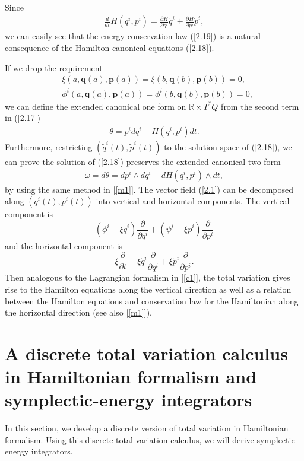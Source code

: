 \documentclass[a4paper,a4paper]{article}
\def\sect#1{\section{#1}\setcounter{equation}{0}}
\def\q{\boldsymbol{q}}
\def\p{\boldsymbol{p}}
\begin{document}
 Since
\begin{align*}
  \frac{d}{dt}H(q^{i}, p^{i})=\frac{\partial H}{\partial q^{i}}\dot{q}^{i}+
                      \frac{\partial H}{\partial p^{i}}\dot{p}^{i},
\end{align*}
 we can easily see that the energy conservation law (\ref{2.19}) is a natural
consequence of the Hamilton canonical equations (\ref{2.18}).

If we drop the requirement
\begin{align*}
 &\xi(a, \q(a), \p(a))=\xi(b, \q(b), \p(b))=0,\\
 &\phi^{i}(a, \q(a), \p(a))=\phi^{i}(b, \q(b), \p(b))=0,
\end{align*}
we can define the extended canonical one form on $\mathbb{R}\times T^{*}Q$ from
the second term in (\ref{2.17})
\begin{align}
\theta=p^{i}dq^{i}-H(q^{i}, p^{i})dt. \label{2.20}
\end{align}
Furthermore, restricting
$(\tilde{q}^{i}(t), \tilde{p}^{i}(t))$ to the solution space of (\ref{2.18}), we can
prove the solution of (\ref{2.18}) preserves
the extended canonical two form
\begin{align}
   \omega=d\theta=dp^{i}\wedge dq^{i}-dH(q^{i}, p^{i})\wedge dt, \label{2.21}
\end{align}
by using the same method in [\ref{m1}]. \vskip6pt  The vector field (\ref{2.1}) can be decomposed along
$(q^{i}(t), p^{i}(t))$ into vertical and horizontal components.
The vertical component is
\[
 (\phi^{i}-\xi \dot{q}^{i})\frac{\partial}{\partial q^{i}}
 +(\psi^{i}-\xi \dot{p}^{i})\frac{\partial}{\partial p^{i}}
 \]
 and the horizontal component is
 \[
   \xi\frac{\partial}{\partial t}+\xi \dot{q}^{i}
   \frac{\partial}{\partial q^{i}}+\xi \dot{p}^{i}
   \frac{\partial}{\partial p^{i}}.
 \]
 Then analogous to the Lagrangian formalism in [\ref{c1}], the total variation gives rise to the Hamilton equations along the vertical
 direction as well as a relation between the Hamilton equations and conservation
 law for the Hamiltonian along the horizontal direction (see also [\ref{m1}]).


\newpage
\sect{A discrete total variation calculus in Hamiltonian formalism
      and symplectic-energy integrators}

In this section, we develop a discrete version of total variation
in Hamiltonian formalism. Using this discrete total variation
calculus, we will derive symplectic-energy integrators.
\end{document}
